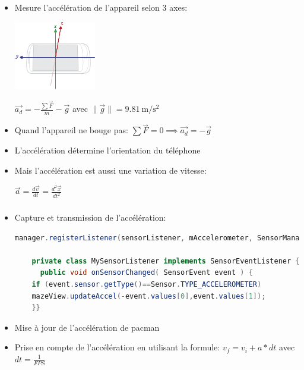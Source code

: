 \documentclass[handout]{beamer}
\newcommand{\norm}[1]{\lVert#1\rVert}
\begin{document}
\begin{frame}
  \frametitle<1->{}
    \begin{itemize}
    \item <1->{Mesure l'accélération de l'appareil selon 3 axes:}
    \begin{center}
      \includegraphics[height=30mm]{accelerometre.png}
    \end{center}
    \begin{center}
      $\vec{a_d} = - \frac{\sum \vec{F}}{m} - \vec{g}$ avec $\norm{\vec{g}} = \SI{9.81}{\meter\per\second\squared}$
    \end{center}

    \item <2->{Quand l'appareil ne bouge pas:}
    $\sum \vec{F} = 0 \implies \vec{a_d} = - \vec{g}$

    \item <4->{L'accélération détermine l'orientation du téléphone}

    \item <3->{Mais l'accélération est aussi une variation de vitesse:}%
    \begin{center}
    $\vec{a} = \frac{{d\vec{\upsilon}}}{{dt}} = \frac{{d^2 \vec{x}}} {{dt^2 }}$
    \end{center}
    \end{itemize}
\end{frame}

\begin{frame}[fragile]
  \frametitle<1->{}
    \begin{itemize}
    \item <1->{Capture et transmission de l'accélération:}%
    \begin{lstlisting}[language=java]
    manager.registerListener(sensorListener, mAccelerometer, SensorManager.SENSOR_DELAY_UI);

    private class MySensorListener implements SensorEventListener {
      public void onSensorChanged( SensorEvent event ) {
    if (event.sensor.getType()==Sensor.TYPE_ACCELEROMETER)
    mazeView.updateAccel(-event.values[0],event.values[1]);
    }}
    \end{lstlisting} %

    \item <2->{Mise à jour de l'accélération de pacman}
    \item <3->{Prise en compte de l'accélération en utilisant la formule:}
    $ v_f = v_i + a*dt $ avec $ dt = \frac{1}{FPS} $
    \end{itemize}
\end{frame}
\end{document}
